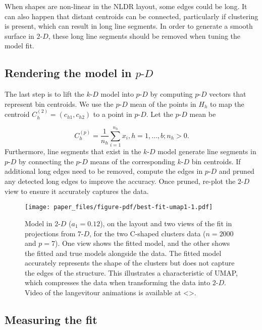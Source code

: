 \documentclass[
  12pt]{article}
\newcommand\pD{$p\text{-}D$}
\newcommand\kD{$k\text{-}D$}
\newcommand\gD{$2\text{-}D$}
\begin{document}
When shapes are non-linear in the NLDR layout, some edges could be long.
It can also happen that distant centroids can be connected, particularly
if clustering is present, which can result in long line segments. In
order to generate a smooth surface in \gD{}, these long line segments
should be removed when tuning the model fit.

\subsection{\texorpdfstring{Rendering the model in
\pD{}}{Rendering the model in }}\label{rendering-the-model-in}

The last step is to lift the \kD{} model into \pD{} by computing \pD{}
vectors that represent bin centroids. We use the \pD{} mean of the
points in \(H_h\) to map the centroid \(C_{h}^{(2)} = (c_{h1}, c_{h2})\)
to a point in \pD{}. Let the \pD{} mean be

\[C_{h}^{(p)} = \frac{1}{n_h}\sum_{i =1}^{n_h} x_i, h = {1, \dots, b; n_h > 0}.\]
Furthermore, line segments that exist in the \kD{} model generate line
segments in \pD{} by connecting the \pD{} means of the corresponding
\kD{} bin centroids. If additional long edges need to be removed,
compute the edges in \pD{} and pruned any detected long edges to improve
the accuracy. Once pruned, re-plot the \gD{} view to ensure it
accurately captures the data.

\begin{figure}[H]

{\centering \texttt{[image: paper\_files/figure-pdf/best-fit-umap1-1.pdf]}

}

\caption{Model in \gD{} (\(a_1 = 0.12\)), on the layout and two views of
the fit in projections from \(7\text{-}D\), for the two C-shaped
clusters data (\(n =  2000\) and \(p = 7\)). One view shows the fitted
model, and the other shows the fitted and true models alongside the
data. The fitted model accurately represents the shape of the clusters
but does not capture the edges of the structure. This illustrates a
characteristic of UMAP, which compresses the data when transforming the
data into \gD{}. Video of the langevitour animations is available at
\textless\textgreater.}

\end{figure}%

\subsection{Measuring the fit}\label{sec-summary}
\end{document}

